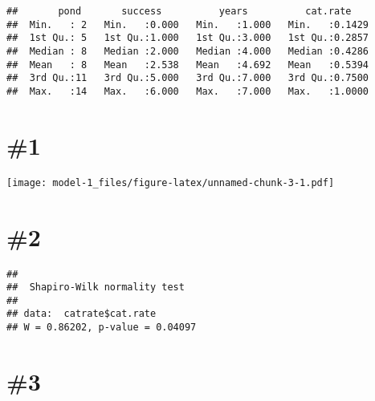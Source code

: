 \documentclass[
]{article}
\newenvironment{Shaded}{\begin{snugshade}}{\end{snugshade}}
\newcommand{\AttributeTok}[1]{\textcolor[rgb]{0.77,0.63,0.00}{#1}}
\newcommand{\FunctionTok}[1]{\textcolor[rgb]{0.00,0.00,0.00}{#1}}
\newcommand{\NormalTok}[1]{#1}
\newcommand{\SpecialCharTok}[1]{\textcolor[rgb]{0.00,0.00,0.00}{#1}}
\newcommand{\StringTok}[1]{\textcolor[rgb]{0.31,0.60,0.02}{#1}}
\begin{document}
\begin{verbatim}
##       pond       success          years          cat.rate     
##  Min.   : 2   Min.   :0.000   Min.   :1.000   Min.   :0.1429  
##  1st Qu.: 5   1st Qu.:1.000   1st Qu.:3.000   1st Qu.:0.2857  
##  Median : 8   Median :2.000   Median :4.000   Median :0.4286  
##  Mean   : 8   Mean   :2.538   Mean   :4.692   Mean   :0.5394  
##  3rd Qu.:11   3rd Qu.:5.000   3rd Qu.:7.000   3rd Qu.:0.7500  
##  Max.   :14   Max.   :6.000   Max.   :7.000   Max.   :1.0000
\end{verbatim}

\hypertarget{section}{%
\section{\#1}\label{section}}

\begin{Shaded}
\end{Shaded}

\texttt{[image: model-1\_files/figure-latex/unnamed-chunk-3-1.pdf]}

\hypertarget{section-1}{%
\section{\#2}\label{section-1}}

\begin{Shaded}
\end{Shaded}

\begin{verbatim}
## 
##  Shapiro-Wilk normality test
## 
## data:  catrate$cat.rate
## W = 0.86202, p-value = 0.04097
\end{verbatim}

\hypertarget{section-2}{%
\section{\#3}\label{section-2}}
\end{document}
